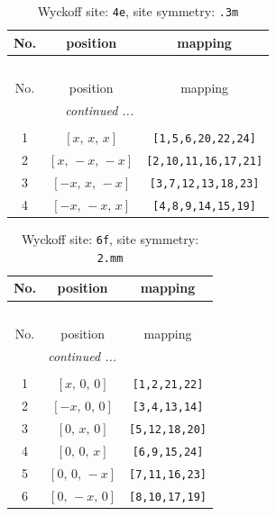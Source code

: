\documentclass[fleqn,8pt]{jsarticle}
\begin{document}
\begin{longtable}{ccc}
\caption{Wyckoff site: {\tt 4e}, site symmetry: {\tt .3m}}
 \\
 \hline \hline
No. & position & mapping \\ \hline \endfirsthead

\multicolumn{2}{l}{\tablename\ \thetable{}} \\
 \hline \hline
No. & position & mapping \\ \hline \endhead

 \hline \hline
\multicolumn{2}{r}{\footnotesize\it continued ...} \\ \endfoot

 \hline \hline
\multicolumn{2}{r}{} \\ \endlastfoot

1 & $\left[ x,\, x,\, x \right]$ & {\tt [1,5,6,20,22,24]} \\ \hline
2 & $\left[ x,\, - x,\, - x \right]$ & {\tt [2,10,11,16,17,21]} \\ \hline
3 & $\left[ - x,\, x,\, - x \right]$ & {\tt [3,7,12,13,18,23]} \\ \hline
4 & $\left[ - x,\, - x,\, x \right]$ & {\tt [4,8,9,14,15,19]} \\
\end{longtable}
\renewcommand{\arraystretch}{1.2}
\begin{longtable}{ccc}
\caption{Wyckoff site: {\tt 6f}, site symmetry: {\tt 2.mm}}
 \\
 \hline \hline
No. & position & mapping \\ \hline \endfirsthead

\multicolumn{2}{l}{\tablename\ \thetable{}} \\
 \hline \hline
No. & position & mapping \\ \hline \endhead

 \hline \hline
\multicolumn{2}{r}{\footnotesize\it continued ...} \\ \endfoot

 \hline \hline
\multicolumn{2}{r}{} \\ \endlastfoot

1 & $\left[ x,\, 0,\, 0 \right]$ & {\tt [1,2,21,22]} \\ \hline
2 & $\left[ - x,\, 0,\, 0 \right]$ & {\tt [3,4,13,14]} \\ \hline
3 & $\left[ 0,\, x,\, 0 \right]$ & {\tt [5,12,18,20]} \\ \hline
4 & $\left[ 0,\, 0,\, x \right]$ & {\tt [6,9,15,24]} \\ \hline
5 & $\left[ 0,\, 0,\, - x \right]$ & {\tt [7,11,16,23]} \\ \hline
6 & $\left[ 0,\, - x,\, 0 \right]$ & {\tt [8,10,17,19]} \\
\end{longtable}
\end{document}
